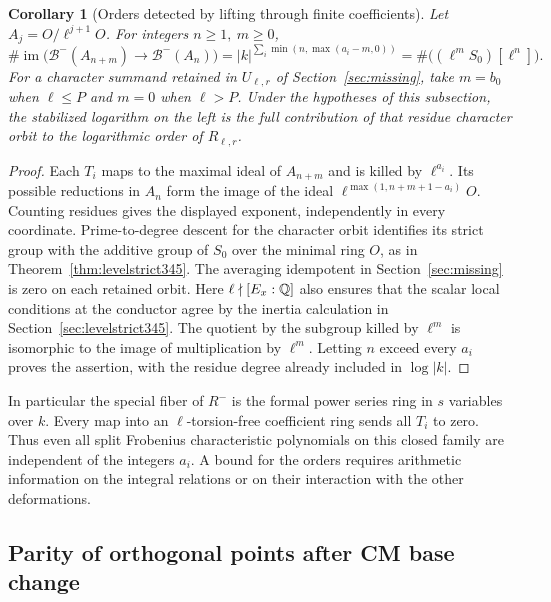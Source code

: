 \documentclass[a4paper,11pt]{article}
\newtheorem{corollary}[proposition]{Corollary}
\theoremstyle{definition}
\theoremstyle{remark}
\numberwithin{equation}{section}
\begin{document}
\begin{corollary}[Orders detected by lifting through finite coefficients]
\label{cor:rootcounts358}
Let \(A_j=O/\ell^{j+1}O\). For integers \(n\ge1,\ m\ge0\),
\[
 \#\operatorname{im}\bigl(\mathcal B^-(A_{n+m})\to
                              \mathcal B^-(A_n)\bigr)
 = |k|^{\sum_i\min(n,\max(a_i-m,0))}
 = \#\bigl((\ell^m S_0)[\ell^n]\bigr).
\]
For a character summand retained in \(U_{\ell,r}\) of
Section~\ref{sec:missing}, take \(m=b_0\) when \(\ell\le P\)
and \(m=0\) when \(\ell>P\). Under the hypotheses of this
subsection, the stabilized logarithm on the left is the full
contribution of that residue character orbit to the logarithmic
order of \(R_{\ell,r}\).
\end{corollary}
\begin{proof}
Each \(T_i\) maps to the maximal ideal of \(A_{n+m}\) and is
killed by \(\ell^{a_i}\). Its possible reductions in \(A_n\)
form the image of the ideal
\(\ell^{\max(1,n+m+1-a_i)}O\). Counting residues gives the
displayed exponent, independently in every coordinate. Prime-to-degree
descent for the character orbit identifies its strict group with
the additive group of \(S_0\) over the minimal ring \(O\), as in
Theorem~\ref{thm:levelstrict345}. The averaging idempotent in
Section~\ref{sec:missing} is zero on each retained orbit.
Here \(\ell\nmid[E_x:\mathbb Q]\) also ensures that the scalar local
conditions at the conductor agree by the inertia calculation in
Section~\ref{sec:levelstrict345}. The quotient by the subgroup killed by \(\ell^m\) is isomorphic
to the image of multiplication by \(\ell^m\). Letting \(n\)
exceed every \(a_i\) proves the assertion, with the residue degree
already included in \(\log |k|\).
\end{proof}

In particular the special fiber of \(R^-\) is the formal power
series ring in \(s\) variables over \(k\). Every map into an
\(\ell\)-torsion-free coefficient ring sends all \(T_i\) to zero.
Thus even all split Frobenius characteristic polynomials on this
closed family are independent of the integers \(a_i\). A bound for
the orders requires arithmetic information on the integral
relations or on their interaction with the other deformations.


\subsection{Parity of orthogonal points after CM base change}\label{sec:paritydescent358}
\end{document}
